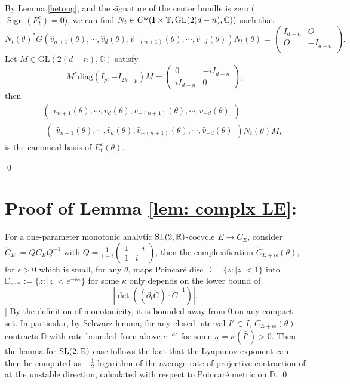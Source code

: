 \documentclass[11pt]{amsart}
\theoremstyle{remark}
\theoremstyle{definition}
\newcommand{\C}{{\mathbf C}}
\newcommand{\I}{{\mathbf I}}
\newcommand{\R}{{\mathbf R}}
\newcommand{\T}{{\mathbf T}}
\newcommand{\DD}{{\mathbb D}}
\newcommand{\SL}{{\rm SL}}
\newcommand{\GL}{{\rm GL}}
\def \C{{\mathcal{C}}}
\def\C{{\mathbb C}}
\def\R{{\mathbb R}}
\def\T{{\mathbb T}}
\begin{document}
By Lemma \ref{hetong}, and the signature of the center bundle is zero ($\operatorname{Sign}(E^c_t)=0 $)\cite{WXZ}, we can find $N_t \in C^\omega(\I\times\T, \GL(2(d-n),\C))$ such that
$$N_t(\theta)^*G(\hat{v}_{n+1}(\theta),\cdots,\hat{v}_d(\theta),\hat{v}_{-(n+1)}(\theta),\cdots,\hat{v}_{-d}(\theta))N_t(\theta)=
\begin{pmatrix}
    I_{d-n}& O \\
    O & -I_{d-n} \\
\end{pmatrix}.$$
Let \(M \in \mathrm{GL}(2(d-n), \mathbb{C})\) satisfy
\[
M^* \mathrm{diag}(I_p, -I_{2k-p}) M = \begin{pmatrix}
0 & -iI_{d-n} \\
iI_{d-n} & 0
\end{pmatrix},
\] then $$\begin{aligned}
    & \quad\begin{pmatrix}
    {v}_{n+1}(\theta),\cdots,{v}_d(\theta),{v}_{-(n+1)}(\theta),\cdots,{v}_{-d}(\theta)
\end{pmatrix}\\&=\begin{pmatrix}
    \hat{v}_{n+1}(\theta),\cdots,\hat{v}_d(\theta),\hat{v}_{-(n+1)}(\theta),\cdots,\hat{v}_{-d}(\theta)
\end{pmatrix}N_t(\theta)M,
\end{aligned}$$
is the canonical basis of $E^c_t(\theta).$
        
\qed


\section{Proof of Lemma \ref{lem: complx LE}: }\label{mono-lya}

For a one-parameter monotonic analytic $\SL(2,\R)$-cocycle $E\to C_E$, consider $\mathring C_E:=QC_EQ^{-1}$ with $Q=\frac{1}{1+i}\begin{pmatrix}
   1&-i\\1&i
\end{pmatrix}$, then the complexification $\mathring{C}_{E+i\epsilon}(\theta)$, for $\epsilon>0$ which is small, for any $\theta$, maps Poincar\'e disc $\mathbb D=\{z:|z|<1\}$ into $\DD_{e^{-\kappa \epsilon}}:= \{z:|z|<e^{-\kappa \epsilon}\}$ for some $\kappa$ only depends on the lower bound of 
\begin{equation*}\label{monlow}
    |\det ((\partial_t \mathring{C})\cdot \mathring{C}^{-1})|.
\end{equation*}| By the definition of monotonicity, it is bounded away from $0$ on any compact set. In particular, by Schwarz lemma, for any closed interval $\bar{I'}\subset I$, $\mathring{C}_{E+i\epsilon}(\theta)$ contracts $\DD$ with rate bounded from above $e^{-\kappa \epsilon}$ for some $\kappa=\kappa(\bar{I'})>0$. Then the lemma for $\SL(2,\R)$-case follows the fact that the Lyapunov exponent can then be computed as $-\frac{1}{2}$ logarithm of 
the average rate of projective contraction of at the unstable direction, calculated with respect to Poincar\'e metric on $\DD$. 
\qed
\end{document}
